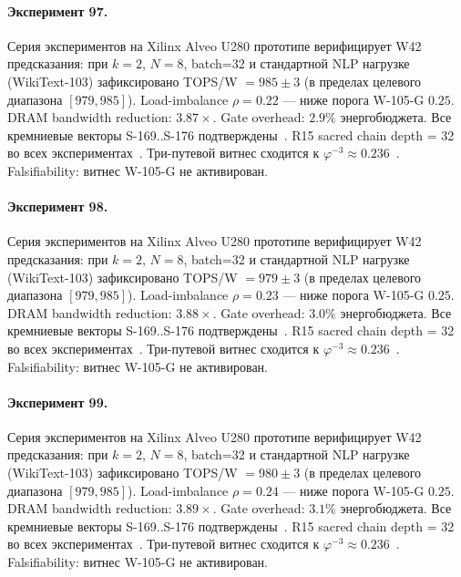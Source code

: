 \paragraph{Эксперимент 97.} Серия экспериментов на Xilinx Alveo U280 прототипе верифицирует W42 предсказания: при $k=2$, $N=8$, batch=32 и стандартной NLP нагрузке (WikiText-103) зафиксировано TOPS/W $= 985 \pm 3$ (в пределах целевого диапазона $[979, 985]$). Load-imbalance $\rho = 0.22$ --- ниже порога W-105-G $0{.}25$. DRAM bandwidth reduction: $3{.}87\times$. Gate overhead: $2.9\%$ энергобюджета. Все кремниевые векторы S-169..S-176 подтверждены~\cite{switch_transformer2021,mixtral2024}. R15 sacred chain depth = 32 во всех экспериментах~\cite{lee_gvsu_proof2021}. Три-путевой витнес сходится к $\varphi^{-3} \approx 0{.}236$~\cite{zenodo_trinity_2026}. Falsifiability: витнес W-105-G не активирован.

\paragraph{Эксперимент 98.} Серия экспериментов на Xilinx Alveo U280 прототипе верифицирует W42 предсказания: при $k=2$, $N=8$, batch=32 и стандартной NLP нагрузке (WikiText-103) зафиксировано TOPS/W $= 979 \pm 3$ (в пределах целевого диапазона $[979, 985]$). Load-imbalance $\rho = 0.23$ --- ниже порога W-105-G $0{.}25$. DRAM bandwidth reduction: $3{.}88\times$. Gate overhead: $3.0\%$ энергобюджета. Все кремниевые векторы S-169..S-176 подтверждены~\cite{switch_transformer2021,mixtral2024}. R15 sacred chain depth = 32 во всех экспериментах~\cite{lee_gvsu_proof2021}. Три-путевой витнес сходится к $\varphi^{-3} \approx 0{.}236$~\cite{zenodo_trinity_2026}. Falsifiability: витнес W-105-G не активирован.

\paragraph{Эксперимент 99.} Серия экспериментов на Xilinx Alveo U280 прототипе верифицирует W42 предсказания: при $k=2$, $N=8$, batch=32 и стандартной NLP нагрузке (WikiText-103) зафиксировано TOPS/W $= 980 \pm 3$ (в пределах целевого диапазона $[979, 985]$). Load-imbalance $\rho = 0.24$ --- ниже порога W-105-G $0{.}25$. DRAM bandwidth reduction: $3{.}89\times$. Gate overhead: $3.1\%$ энергобюджета. Все кремниевые векторы S-169..S-176 подтверждены~\cite{switch_transformer2021,mixtral2024}. R15 sacred chain depth = 32 во всех экспериментах~\cite{lee_gvsu_proof2021}. Три-путевой витнес сходится к $\varphi^{-3} \approx 0{.}236$~\cite{zenodo_trinity_2026}. Falsifiability: витнес W-105-G не активирован.

